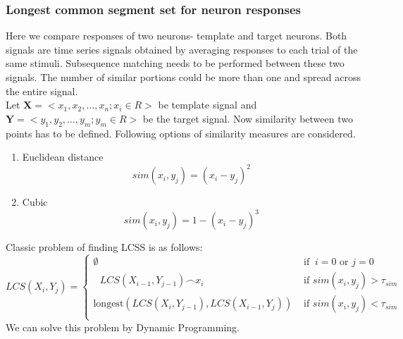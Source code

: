\documentclass[11pt,paper=a4,answers]{exam}
\begin{document}
\subsubsection{Longest common segment set for neuron responses} %
\label{ssub:longest_common_segment_set_for_neuron_responses}
Here we compare responses of two neurons- template and target neurons. Both signals are time series signals obtained by averaging responses to each trial of the same stimuli. Subsequence matching needs to be performed
between these two signals. The number of similar portions could be more than one and spread across the entire signal.\\
Let $\bm{X} = < x_1, x_2,\hdots, x_n ; x_i \in R >$ be template signal and $\bm{Y} = <y_1, y_2, \hdots, y_m ; y_m \in R>$ be the target signal. Now similarity between two points has to be defined. Following options of similarity measures are considered.
\begin{enumerate}
    \item Euclidean distance\\
    $$sim(x_i, y_j) =  (x_i - y_j)^2$$
    \item Cubic\\
    $$sim(x_i, y_j) =  1 - (x_i - y_j)^3$$
\end{enumerate}
Classic problem of finding LCSS is as follows:
$$
LCS\left(X_{i},Y_{j}\right) =
\begin{cases}
  \emptyset
& \mbox{ if }\ i = 0 \mbox{ or }  j = 0 \\
  \textrm{  } LCS\left(X_{i-1},Y_{j-1}\right) \frown x_{i}
& \mbox{ if } sim(x_i , y_j) > \tau_{sim} \\
  \mbox{longest}\left(LCS\left(X_{i},Y_{j-1}\right),LCS\left(X_{i-1},Y_{j}\right)\right)
& \mbox{ if } sim(x_i , y_j) < \tau_{sim} \\
\end{cases}
$$
We can solve this problem by Dynamic Programming.
\newpage
\end{document}
